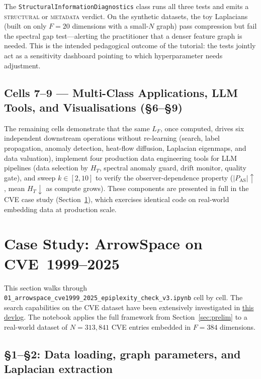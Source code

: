 \documentclass[12pt,a4paper]{article}
\theoremstyle{plain}
\theoremstyle{definition}
\theoremstyle{remark}
\newcommand{\1}{\mathbf{1}}
\begin{document}
	The \texttt{StructuralInformationDiagnostics} class runs all three tests
	and emits a \textsc{structural} or \textsc{metadata} verdict.
	On the synthetic datasets, the toy Laplacians (built on only $F=20$
	dimensions with a small-$N$ graph) pass compression but fail the
	spectral gap test---alerting the practitioner that a denser
	feature graph is needed.
	This is the intended pedagogical outcome of the tutorial: the tests
	jointly act as a sensitivity dashboard pointing to which hyperparameter
	needs adjustment.
	
	\subsection{Cells 7--9 --- Multi-Class Applications, LLM Tools, and Visualisations (§6--§9)}
	
	The remaining cells demonstrate that the same $L_F$, once computed,
	drives six independent downstream operations without re-learning
	(search, label propagation, anomaly detection, heat-flow diffusion,
	Laplacian eigenmaps, and data valuation), implement four production data
	engineering tools for LLM pipelines (data selection by $H_T$, spectral
	anomaly guard, drift monitor, quality gate), and sweep $k\in[2,10]$ to
	verify the observer-dependence property ($|P_\mathrm{AS}|\uparrow$,
	mean $H_T\downarrow$ as compute grows).
	These components are presented in full in the CVE case study
	(Section~\ref{sec:notebook}), which exercises identical code on
	real-world embedding data at production scale.
	
	\section{Case Study: ArrowSpace on CVE~1999--2025}
	\label{sec:notebook}
	
	This section walks through
	\texttt{01\_arrowspace\_cve1999\_2025\_epiplexity\_check\_v3.ipynb}
	cell by cell. The search capabilities on the CVE dataset have been extensively investigated in \href{https://www.tuned.org.uk/blog}{this devlog}.
	The notebook applies the full framework from Section~\ref{sec:prelim}
	to a real-world dataset of $N=313{,}841$ CVE entries embedded in
	$F=384$ dimensions.
	
	\subsection{§1--§2: Data loading, graph parameters, and Laplacian extraction}
	
\end{document}
